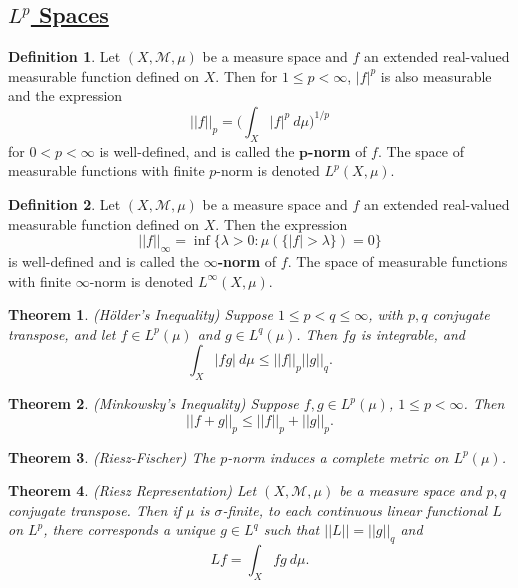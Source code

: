 \documentclass[11pt]{amsart}
\newtheorem*{theorem*}{Theorem}
\theoremstyle{definition}
\newtheorem*{definition*}{Definition}
\renewcommand\leq{\leqslant}
\renewcommand\:{\colon}
\newcommand{\calM}{\mathcal{M}}
\newcommand{\dmu}{\ d\mu}
\begin{document}
\subsection*{\underline{$L^p$ Spaces}}

\begin{definition*}
	Let $(X, \calM, \mu)$ be a measure space and $f$ an extended real-valued measurable function defined on $X$. Then for $1 \leq p < \infty$, $|f|^p$ is also measurable and the expression
		\[ ||f||_p = \bigg( \int_X|f|^p \dmu \bigg)^{1/p} \]
	for $0 < p < \infty$ is well-defined, and is called the \textbf{$\boldsymbol{p}$-norm} of $f$. The space of measurable functions with finite $p$-norm is denoted $L^p(X, \mu)$.
\end{definition*}

\begin{definition*}
	Let $(X, \calM, \mu)$ be a measure space and $f$ an extended real-valued measurable function defined on $X$. Then the expression
		\[ ||f||_\infty = \inf \{ \lambda > 0 : \mu(\{|f| > \lambda \}) = 0\} \]
	is well-defined and is called the \textbf{$\boldsymbol{\infty}$-norm} of $f$. The space of measurable functions with finite $\infty$-norm is denoted $L^\infty(X,\mu)$.
\end{definition*}

\begin{theorem*}
	\textnormal{(H\"older's Inequality)} Suppose $1 \leq p < q \leq \infty$, with $p, q$ conjugate transpose, and let $f \in L^p(\mu)$ and $g \in L^q(\mu)$. Then $fg$ is integrable, and 
		\[ \int_X |fg| \dmu \leq ||f||_p||g||_q.  \]
\end{theorem*}

\begin{theorem*}
	\textnormal{(Minkowsky's Inequality)} Suppose $f, g \in L^p(\mu)$, $1 \leq p < \infty$. Then 
		\[ ||f + g||_p \leq ||f||_p + ||g||_p. \]
\end{theorem*}

\begin{theorem*}
	\textnormal{(Riesz-Fischer)} The $p$-norm induces a complete metric on $L^p(\mu)$.
\end{theorem*}

\begin{theorem*}
	\textnormal{(Riesz Representation)} Let $(X, \calM, \mu)$ be a measure space and $p,q$ conjugate transpose. Then if $\mu$ is $\sigma$-finite, to each continuous linear functional $L$ on $L^p$, there corresponds a unique $g \in L^q$ such that $||L|| = ||g||_q$ and 
		\[ Lf = \int_X fg \dmu. \]
\end{theorem*}
\end{document}
